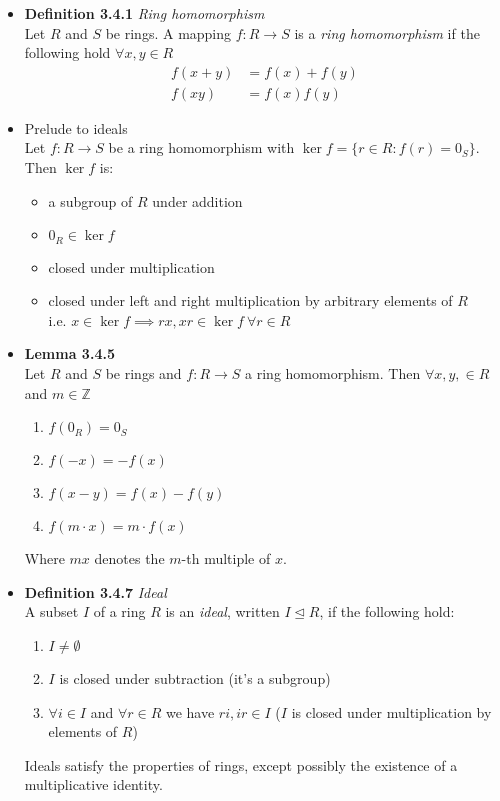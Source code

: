 \documentclass[11pt,a4paper]{article}
\begin{document}
\begin{itemize}

    \item \textbf{Definition 3.4.1} \emph{Ring homomorphism} \\
        Let $R$ and $S$ be rings.
        A mapping $f : R \to S$ is a \emph{ring homomorphism} if the following hold
        $\forall x,y\in R$
        \begin{align*}{}
            f(x+y) & = f(x) + f(y) \\
            f(xy)  & = f(x)f(y)
        \end{align*}

    \item Prelude to ideals \\
        Let $f : R \to S$ be a ring homomorphism with $\ker f = \{ r \in R : f(r) = 0_S \}$.
        Then $\ker f$ is:
        \begin{itemize}
            \item a subgroup of $R$ under addition
            \item $0_R \in \ker f$
            \item closed under multiplication
            \item closed under left and right multiplication by arbitrary elements of $R$ \\
                i.e. $x \in \ker f \implies rx, xr \in \ker f \ \forall r \in R$
        \end{itemize}

    \item \textbf{Lemma 3.4.5} \\
        Let $R$ and $S$ be rings and $f : R \to S$ a ring homomorphism.
        Then $\forall x,y, \in R$ and $m \in \mathbb{Z}$
        \begin{enumerate}
            \item $f(0_R)       = 0_S$
            \item $f(-x)        = -f(x)$
            \item $f(x-y)       = f(x) - f(y)$
            \item $f(m \cdot x) = m\cdot f(x)$
        \end{enumerate}
        Where $mx$ denotes the $m$-th multiple of $x$.

    \item \textbf{Definition 3.4.7} \emph{Ideal} \\
        A subset $I$ of a ring $R$ is an \emph{ideal}, written $I \trianglelefteq R$,
        if the following hold:
        \begin{enumerate}
            \item $I \neq \emptyset$
            \item $I$ is closed under subtraction (it's a subgroup)
            \item $\forall i \in I$ and $\forall r \in R$ we have $ri, ir \in I$
                ($I$ is closed under multiplication by elements of $R$)
        \end{enumerate}
        Ideals satisfy the properties of rings, except possibly the existence of a
        multiplicative identity.


\end{itemize}
\end{document}
